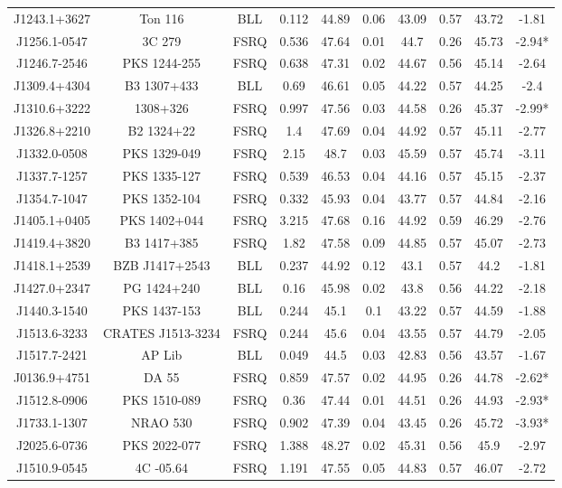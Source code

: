 \documentclass[12pt]{article}
\begin{document}
\begin{landscape}
\begin{longtable}{cccccccccc}
J1243.1+3627 & Ton 116 & BLL & 0.112 & 44.89 & 0.06 & 43.09 & 0.57 & 43.72 & -1.81 \\
J1256.1-0547 & 3C 279 & FSRQ & 0.536 & 47.64 & 0.01 & 44.7 & 0.26 & 45.73 & -2.94* \\
J1246.7-2546 & PKS 1244-255 & FSRQ & 0.638 & 47.31 & 0.02 & 44.67 & 0.56 & 45.14 & -2.64 \\
J1309.4+4304 & B3 1307+433 & BLL & 0.69 & 46.61 & 0.05 & 44.22 & 0.57 & 44.25 & -2.4 \\
J1310.6+3222 & 1308+326 & FSRQ & 0.997 & 47.56 & 0.03 & 44.58 & 0.26 & 45.37 & -2.99* \\
J1326.8+2210 & B2 1324+22 & FSRQ & 1.4 & 47.69 & 0.04 & 44.92 & 0.57 & 45.11 & -2.77 \\
J1332.0-0508 & PKS 1329-049 & FSRQ & 2.15 & 48.7 & 0.03 & 45.59 & 0.57 & 45.74 & -3.11 \\
J1337.7-1257 & PKS 1335-127 & FSRQ & 0.539 & 46.53 & 0.04 & 44.16 & 0.57 & 45.15 & -2.37 \\
J1354.7-1047 & PKS 1352-104 & FSRQ & 0.332 & 45.93 & 0.04 & 43.77 & 0.57 & 44.84 & -2.16 \\
J1405.1+0405 & PKS 1402+044 & FSRQ & 3.215 & 47.68 & 0.16 & 44.92 & 0.59 & 46.29 & -2.76 \\
J1419.4+3820 & B3 1417+385 & FSRQ & 1.82 & 47.58 & 0.09 & 44.85 & 0.57 & 45.07 & -2.73 \\
J1418.1+2539 & BZB J1417+2543 & BLL & 0.237 & 44.92 & 0.12 & 43.1 & 0.57 & 44.2 & -1.81 \\
J1427.0+2347 & PG 1424+240 & BLL & 0.16 & 45.98 & 0.02 & 43.8 & 0.56 & 44.22 & -2.18 \\
J1440.3-1540 & PKS 1437-153 & BLL & 0.244 & 45.1 & 0.1 & 43.22 & 0.57 & 44.59 & -1.88 \\
J1513.6-3233 & CRATES J1513-3234 & FSRQ & 0.244 & 45.6 & 0.04 & 43.55 & 0.57 & 44.79 & -2.05 \\
J1517.7-2421 & AP Lib & BLL & 0.049 & 44.5 & 0.03 & 42.83 & 0.56 & 43.57 & -1.67 \\
J0136.9+4751 & DA 55 & FSRQ & 0.859 & 47.57 & 0.02 & 44.95 & 0.26 & 44.78 & -2.62* \\
J1512.8-0906 & PKS 1510-089 & FSRQ & 0.36 & 47.44 & 0.01 & 44.51 & 0.26 & 44.93 & -2.93* \\
J1733.1-1307 & NRAO 530 & FSRQ & 0.902 & 47.39 & 0.04 & 43.45 & 0.26 & 45.72 & -3.93* \\
J2025.6-0736 & PKS 2022-077 & FSRQ & 1.388 & 48.27 & 0.02 & 45.31 & 0.56 & 45.9 & -2.97 \\
J1510.9-0545 & 4C -05.64 & FSRQ & 1.191 & 47.55 & 0.05 & 44.83 & 0.57 & 46.07 & -2.72 \\

\end{longtable}
\end{landscape}
\end{document}
